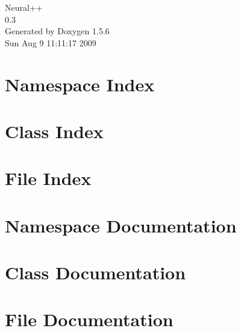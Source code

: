 \documentclass[a4paper]{book}
\begin{document}
\begin{titlepage}
\vspace*{7cm}
\begin{center}
{\Large Neural++ \\[1ex]\large 0.3 }\\
\vspace*{1cm}
{\large Generated by Doxygen 1.5.6}\\
\vspace*{0.5cm}
{\small Sun Aug 9 11:11:17 2009}\\
\end{center}
\end{titlepage}
\clearemptydoublepage
{}
\tableofcontents
\clearemptydoublepage
{}
\chapter{Namespace Index}

\chapter{Class Index}

\chapter{File Index}

\chapter{Namespace Documentation}

\chapter{Class Documentation}



















\chapter{File Documentation}



\printindex
\end{document}
